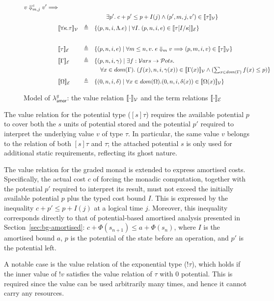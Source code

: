 \begin{figure}[H]
\[\begin{alignedat}{2}
      v\Downarrow^c_{m,j}v' \Longrightarrow\\
&&&\qquad\exists p'.\;c+p'\leq p+I(j) \land
       (p',m,j,v')\in\llbracket \tau \rrbracket_{\mathcal{V}}\}\\[0.5ex]
&\llbracket \forall\kappa.\tau \rrbracket_{\mathcal{V}}
  &\quad\triangleq\quad&
    \{(p,n,i,\Lambda.e)\mid\forall I.\;
        (p,n,i,e)\in\llbracket \tau[I/\kappa] \rrbracket_{\mathcal{E}}\}\\[0.8ex]
\\
&\llbracket \tau \rrbracket_{\mathcal{E}}
  &\quad\triangleq\quad&
    \{(p,n,i,e)\mid\forall m\leq n,v.\;e\Downarrow_m v
        \Longrightarrow(p,m,i,v)\in\llbracket \tau \rrbracket_{\mathcal{V}}\}\\[0.8ex]
&\llbracket \Gamma \rrbracket_{\mathcal{E}}
  &\quad\triangleq\quad&
    \{(p,n,i,\gamma)\mid\exists f:\mathcal{V}ars\to \mathcal{P}ots.\\
&&&\quad\forall x\in{dom}(\Gamma).\;(f(x),n,i,\gamma(x))\in\llbracket \Gamma(x) \rrbracket_{\mathcal{V}} \land
        (\textstyle\sum_{x\in dom(\Gamma)}f(x)\leq p)\}\\[0.5ex]
&\llbracket \Omega \rrbracket_{\mathcal{E}}
  &\quad\triangleq\quad&
    \{(0,n,i,\delta)\mid\forall x\in{dom}(\Omega).
        (0,n,i,\delta(x))\in\llbracket \Omega(x) \rrbracket_{\mathcal{V}}\}
\end{alignedat}
\]
\caption{Model of $\lambda^g_{\mathsf{amor}}$: the value relation $\llbracket \cdot \rrbracket_{\mathcal{V}}$ and the term relations $\llbracket \cdot \rrbracket_{\mathcal{E}}$}
\label{fig:amor-model}
\end{figure}

The value relation for the potential type ($[s]\tau$) requires the available potential $p$ to cover both the $s$ units of potential stored and the potential $p'$ required to interpret the underlying value $v$ of type $\tau$. 
In particular, the same value $v$ belongs to the relation of both $[s]\tau$ and $\tau$; the attached potential $s$ is only used for additional 
static requirements, reflecting its ghost nature.

The value relation for the graded monad is extended to express amortised costs. 
Specifically, the actual cost $c$ of forcing the monadic computation, 
together with the potential $p'$ required to interpret its result, must not exceed the initially available potential $p$ 
plus the typed cost bound $I$. This is expressed by the inequality $c+p'\leq p+I(j)$ at a logical time $j$.
Moreover, this inequality corresponds directly to that of potential-based amortised analysis presented in Section~\ref{sec:bg-amortised}: $c + \Phi(s_{n+1}) \leq a + \Phi(s_{n})$, 
where $I$ is the amortised bound $a$, $p$ is the potential of the state before an operation, and $p'$ is the potential left.

A notable case is the value relation of the exponential type ($!\tau$), which holds if the inner value 
of $!v$ satisfies the value relation of $\tau$ with 0 potential. This is required since the value can be used 
arbitrarily many times, and hence it cannot carry any resources.

